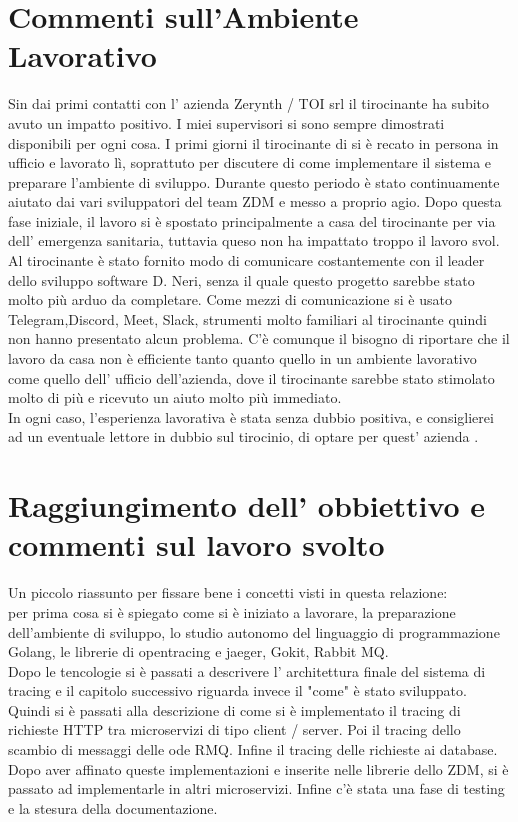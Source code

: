 \documentclass[a4paper,12pt,titlepage,italian,openany]{report}
\begin{document}
\section{Commenti sull'Ambiente Lavorativo}
Sin dai primi contatti con l' azienda Zerynth / TOI srl il tirocinante ha subito avuto un impatto positivo. I miei supervisori si sono sempre dimostrati disponibili per ogni cosa.
I primi giorni il tirocinante di si è recato in persona in ufficio e lavorato lì, soprattuto per discutere di come implementare il sistema e preparare l'ambiente di sviluppo. Durante questo periodo è stato continuamente aiutato dai vari sviluppatori del team ZDM\cite{zdm:1} e messo a proprio agio.
Dopo questa fase iniziale, il lavoro si è spostato principalmente a casa del tirocinante per via dell' emergenza sanitaria, tuttavia queso non ha impattato troppo il lavoro svol. Al tirocinante è stato fornito modo di comunicare costantemente con il leader dello sviluppo software D. Neri, senza il quale questo progetto sarebbe stato molto più arduo da completare.
Come mezzi di comunicazione si è usato Telegram,Discord, Meet, Slack, strumenti molto familiari al tirocinante quindi non hanno presentato alcun problema. C'è comunque il bisogno di riportare che il lavoro da casa non è efficiente tanto quanto quello in un ambiente lavorativo come quello dell' ufficio dell'azienda, dove il tirocinante sarebbe stato stimolato molto di più e ricevuto un aiuto molto più immediato. 
\\ In ogni caso, l'esperienza lavorativa è stata senza dubbio positiva, e consiglierei ad un eventuale lettore in dubbio sul tirocinio, di optare per quest' azienda .


\section{Raggiungimento dell' obbiettivo e commenti sul lavoro svolto}
Un piccolo riassunto per fissare bene i concetti visti in questa relazione:\\
per prima cosa si è spiegato come si è iniziato a lavorare, la preparazione dell'ambiente di sviluppo, lo studio autonomo del linguaggio di programmazione 
Golang, le librerie di opentracing e jaeger, Gokit, Rabbit MQ. \\
Dopo le tencologie si è passati a descrivere l' architettura finale del sistema di tracing e il capitolo successivo riguarda invece il "come" è stato sviluppato. 
Quindi si è passati alla descrizione di come si è implementato il tracing
di richieste HTTP tra microservizi di tipo client / server. Poi il tracing dello scambio di messaggi delle ode RMQ. Infine  il tracing delle richieste ai database.
Dopo aver affinato queste implementazioni e inserite nelle librerie dello ZDM\cite{zdm:1}, si è passato ad implementarle in altri microservizi. Infine c'è stata una fase di testing e la stesura della documentazione.
\end{document}
